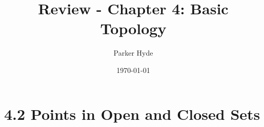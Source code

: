 \documentclass{article}
\begin{document}
\title{Review - Chapter 4: Basic Topology}
\author{Parker Hyde}
\date{\today}
\maketitle

\newtheorem{theorem}{Theorem}
\newtheorem{definition}{Definition}
\newtheorem{exmp}{Example}
\newtheorem{proposition}{Proposition}
\newtheorem{lemma}{Lemma}
\newtheorem{corollary}{Corollary}
\newtheorem{remark}{Remark}

\section*{4.2 Points in Open and Closed Sets}
\end{document}
